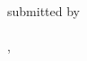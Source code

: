 \begin{titlepage}
\begin{center}
{     

     submitted by \\

     {\rmfamily \bfseries \Large \getAuthor} \\


     \getPrintLocationEN, \getSubmissionDateEN
     }
  \end{center}
  

\end{titlepage}
